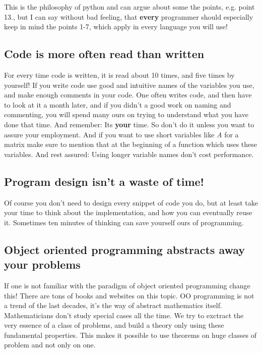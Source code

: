 \documentclass[letterpaper,10pt,english]{manual}
\begin{document}
This is the philosophy of python and can argue about some the points,
e.g. point 13., but I can say without bad feeling, that \textbf{every}
programmer should especially keep in mind the points 1-7, which apply in every
language you will use!


\subsection{Code is more often read than written}

For every time code is written, it is read about 10 times, and
five times by yourself! If you write code use good and intuitive
names of the variables you use, and make enough comments in your code.
One often writes code, and then have to look at it a month later, and if
you didn't a good work on naming and commenting, you will spend many ours
on trying to understand what you have done that time. And remember: Its \textbf{your} time.
So don't do it unless you want to assure your employment.
And if you want to use short variables like \emph{A} for a matrix make sure to mention
that at the beginning of a function which uses these variables.
And rest assured: Using longer variable names don't cost performance.


\subsection{Program design isn't a waste of time!}

Of course you don't need to design every snippet of code you do,
but at least take your time to think about the implementation, and
how you can eventually reuse it. Sometimes ten minutes of thinking
can save yourself ours of programming.
\hypertarget{oo-ref}{}

\subsection{Object oriented programming abstracts away your problems}

If one is not familiar with the paradigm of object oriented programming change this!
There are tons of books and websites on this topic.
OO programming is not a trend of the last decades, it's the way of abstract mathematics itself.
Mathematicians don't study special cases all the time. We try to exctract the very essence of a class
of problems, and build a theory only using these fundamental properties. This makes it possible to
use theorems on huge classes of problem and not only on one.
\end{document}
